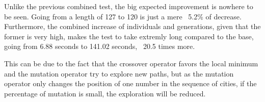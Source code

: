 Unlike the previous combined test, the big expected improvement is nowhere
to be seen. Going from a length of 127 to 120 is just a mere ~5.2\% of
decrease. Furthermore, the combined increase of individuals and
generations, given that the former is very high, makes the test to take extremly
long compared to the base, going from 6.88 seconds to 141.02 seconds, ~20.5
times more. 

This can be due to the fact that the crossover operator favors the local minimum and the mutation 
operator try to explore new paths, but as the mutation operator only changes the position of one number in 
the sequence of cities, if the percentage of mutation is small, the exploration will be reduced.


